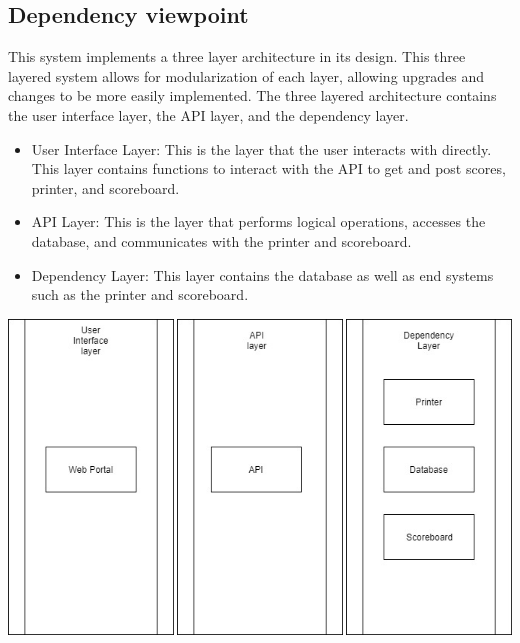 \documentclass[letterpaper,10pt,draftclsnofoot,onecolumn,]{article}
\begin{document}
\subsection{Dependency viewpoint}
This system implements a three layer architecture in its design. This three layered system allows for modularization of each layer, allowing upgrades and changes to be more easily implemented.\newline
The three layered architecture contains the user interface layer, the API layer, and the dependency layer.
\begin{itemize}
    \item User Interface Layer: This is the layer that the user interacts with directly. This layer contains functions to interact with the API to get and post scores, printer, and scoreboard.
    \item API Layer: This is the layer that performs logical operations, accesses the database, and communicates with the printer and scoreboard.
    \item Dependency Layer: This layer contains the database as well as end systems such as the printer and scoreboard.
\end{itemize}
\includegraphics[width=\textwidth,height=\textheight,keepaspectratio]{dependencydiagram}
\end{document}
